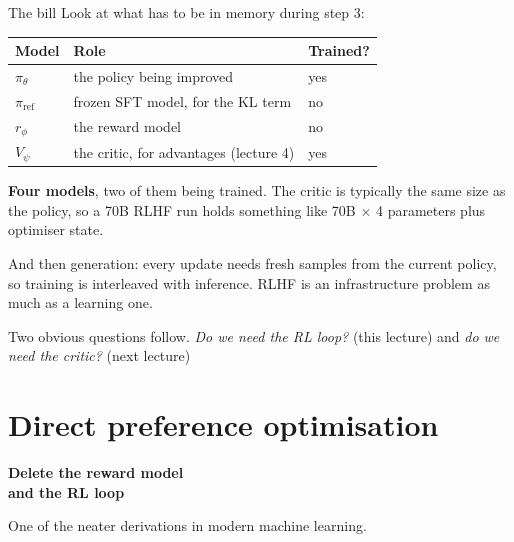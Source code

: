 \documentclass[aspectratio=169]{beamer}
\begin{document}
\begin{frame}{The bill}
  \small
  Look at what has to be in memory during step 3:

  \vskip 8pt
  \begin{center}
  \footnotesize
  \begin{tabular}{l l l}
    \toprule
    \textbf{Model} & \textbf{Role} & \textbf{Trained?} \\
    \midrule
    $\pi_\theta$ & the policy being improved & yes \\
    $\pi_{\text{ref}}$ & frozen SFT model, for the KL term & no \\
    $r_\phi$ & the reward model & no \\
    $V_\psi$ & the critic, for advantages (lecture 4) & yes \\
    \bottomrule
  \end{tabular}
  \end{center}

  \vskip 8pt
  \begin{tcolorbox}[colback=armred!8, colframe=armred, boxrule=0.7pt, arc=2pt]
    \small
    \textbf{Four models}, two of them being trained. The critic is typically the same size as
    the policy, so a 70B RLHF run holds something like 70B $\times$ 4 parameters plus optimiser
    state.

    \vskip 4pt
    And then generation: every update needs fresh samples from the current policy, so training
    is interleaved with inference. RLHF is an infrastructure problem as much as a learning one.
  \end{tcolorbox}

  \vskip 6pt
  \begin{center}
    \small
    Two obvious questions follow. \emph{Do we need the RL loop?} (this lecture) and
    \emph{do we need the critic?} (next lecture)
  \end{center}
\end{frame}

\section{Direct preference optimisation}
\begin{frame}[plain]
  \begin{center}
    \vskip 1.6cm
    {\Huge\bfseries\color{popblue}Delete the reward model\\ and the RL loop}

    \vskip 0.6cm
    {\large One of the neater derivations in modern machine learning.}
  \end{center}
\end{frame}
\end{document}
